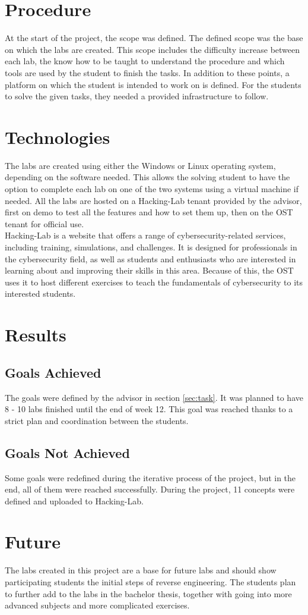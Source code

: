 \section{Procedure}
At the start of the project, the scope was defined. The defined scope was the base on which the labs are created. This scope includes the difficulty increase between each lab, the know how to be taught to understand the procedure and which tools are used by the student to finish the tasks. In addition to these points, a platform on which the student is intended to work on is defined.
For the students to solve the given tasks, they needed a provided infrastructure to follow.

\section{Technologies}
The labs are created using either the Windows or Linux operating system, depending on the software needed. This allows the solving student to have the option to complete each lab on one of the two systems using a virtual machine if needed. 
All the labs are hosted on a Hacking-Lab tenant provided by the advisor, first on demo to test all the features and how to set them up, then on the OST tenant for official use. \\
Hacking-Lab is a website that offers a range of cybersecurity-related services, including training, simulations, and challenges. It is designed for professionals in the cybersecurity field, as well as students and enthusiasts who are interested in learning about and improving their skills in this area.
Because of this, the OST uses it to host different exercises to teach the fundamentals of cybersecurity to its interested students.

\section{Results}
\subsection{Goals Achieved}
The goals were defined by the advisor in section \ref{sec:task}. It was planned to have 8 - 10 labs finished until the end of week 12. This goal was reached thanks to a strict plan and coordination between the students.

\subsection{Goals Not Achieved}
Some goals were redefined during the iterative process of the project, but in the end, all of them were reached successfully. During the project, 11 concepts were defined and uploaded to Hacking-Lab.

\section{Future}
The labs created in this project are a base for future labs and should show participating students the initial steps of reverse engineering. The students plan to further add to the labs in the bachelor thesis, together with going into more advanced subjects and more complicated exercises. 
